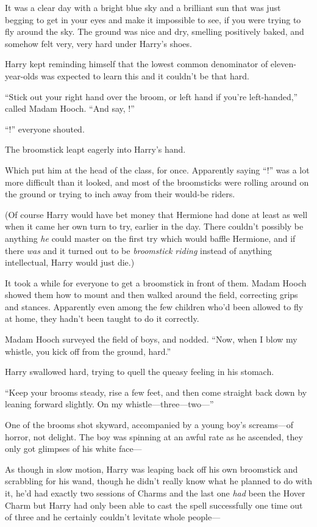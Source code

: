 It was a clear day with a bright blue sky and a brilliant sun that was just begging to get in your eyes and make it impossible to see, if you were trying to fly around the sky. The ground was nice and dry, smelling positively baked, and somehow felt very, very hard under Harry’s shoes.

Harry kept reminding himself that the lowest common denominator of eleven-year-olds was expected to learn this and it couldn’t be that hard.

“Stick out your right hand over the broom, or left hand if you’re left-handed,” called Madam Hooch. “And say, !”

“!” everyone shouted.

The broomstick leapt eagerly into Harry’s hand.

Which put him at the head of the class, for once. Apparently saying “!” was a lot more difficult than it looked, and most of the broomsticks were rolling around on the ground or trying to inch away from their would-be riders.

(Of course Harry would have bet money that Hermione had done at least as well when it came her own turn to try, earlier in the day. There couldn’t possibly be anything \emph{he} could master on the first try which would baffle Hermione, and if there \emph{was} and it turned out to be \emph{broomstick riding} instead of anything intellectual, Harry would just die.)

It took a while for everyone to get a broomstick in front of them. Madam Hooch showed them how to mount and then walked around the field, correcting grips and stances. Apparently even among the few children who’d been allowed to fly at home, they hadn’t been taught to do it correctly.

Madam Hooch surveyed the field of boys, and nodded. “Now, when I blow my whistle, you kick off from the ground, hard.”

Harry swallowed hard, trying to quell the queasy feeling in his stomach.

“Keep your brooms steady, rise a few feet, and then come straight back down by leaning forward slightly. On my whistle—three—two—”

One of the brooms shot skyward, accompanied by a young boy’s screams—of horror, not delight. The boy was spinning at an awful rate as he ascended, they only got glimpses of his white face—

As though in slow motion, Harry was leaping back off his own broomstick and scrabbling for his wand, though he didn’t really know what he planned to do with it, he’d had exactly two sessions of Charms and the last one \emph{had} been the Hover Charm but Harry had only been able to cast the spell successfully one time out of three and he certainly couldn’t levitate whole people—

